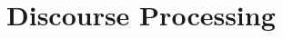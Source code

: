 \documentclass[11pt, a4paper]{article}
\begin{document}


\section{Discourse Processing}
\end{document}
